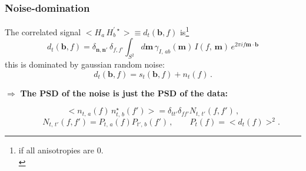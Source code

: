 \begin{frame}
	\frametitle{Noise-domination}
    \bigskip
    \medskip
    The correlated signal $<H_a\,H_b^{'\,\star}> \equiv d_t(\bm{b},f)$ is\footnote{if all anisotropies are 0. \\}
    \begin{equation}
d_t(\bm{b},f) =\delta_{\bm{n},\bm{n}'}\,\delta_{f,f'}\int_{S^2} d\bm{m}\, \gamma_{I,\,ab}(\bm{m})\,I(f,\,\bm{m})\,e^{2\pi i f \bm{m}\cdot\bm{b}}%
%
\label{corr}
\end{equation}
	this is dominated by gaussian random noise:
    \begin{equation}
	d_t(\bm{b},f) = s_t(\bm{b},f)+n_t(f)\,.
	\end{equation}
	
    \begin{block}{}
    $\Rightarrow$ \textbf{The PSD of the noise is just the PSD of the data:}
    \end{block}
	\begin{equation}
	<n_{t,\, a}(f)\,n_{t,\,b}^\star(f')> = \delta_{tt'}\delta_{ff'}N_{t,\,t'}(f, f')\,,
	\end{equation}
    $$
    \qquad N_{t,\,t'}(f,f') = P_{t,\, a}(f)P_{t',\, b}(f')\,, \qquad P_t(f) = <d_t(f)>^2.
    $$
    \medskip
    
    
    
\end{frame}

		
        
        

        
